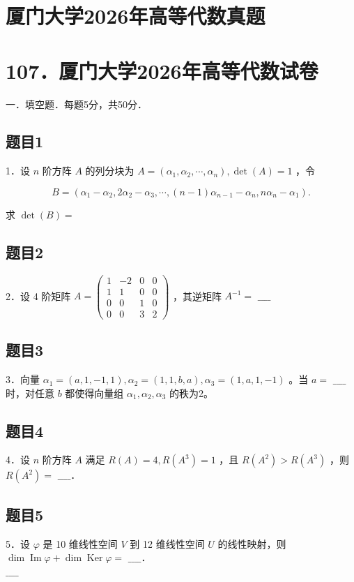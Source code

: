 \documentclass{article}
\begin{document}
\section*{厦门大学2026年高等代数真题}
\section*{107．厦门大学2026年高等代数试卷}
一．填空题．每题5分，共50分．\\

\subsection{题目1}
1．设 \(n\) 阶方阵 \(A\) 的列分块为 \(A=\left(\alpha_{1}, \alpha_{2}, \cdots, \alpha_{n}\right), \operatorname{det}(A)=1\) ，令

\[
B=\left(\alpha_{1}-\alpha_{2}, 2 \alpha_{2}-\alpha_{3}, \cdots,(n-1) \alpha_{n-1}-\alpha_{n}, n \alpha_{n}-\alpha_{1}\right) .
\]

求 \(\operatorname{det}(B)=\)

\subsection{题目2}
2．设 4 阶矩阵 \(A=\left(\begin{array}{cccc}1 & -2 & 0 & 0 \\ 1 & 1 & 0 & 0 \\ 0 & 0 & 1 & 0 \\ 0 & 0 & 3 & 2\end{array}\right)\) ，其逆矩阵 \(A^{-1}=\) \(\_\_\_\_\)

\subsection{题目3}
3．向量 \(\alpha_{1}=(a, 1,-1,1), \alpha_{2}=(1,1, b, a), \alpha_{3}=(1, a, 1,-1)\) 。当 \(a=\) \(\_\_\_\_\)时，对任意 \(b\) 都使得向量组 \(\alpha_{1}, \alpha_{2}, \alpha_{3}\) 的秩为2。

\subsection{题目4}
4．设 \(n\) 阶方阵 \(A\) 满足 \(R(A)=4, R\left(A^{3}\right)=1\) ，且 \(R\left(A^{2}\right)>R\left(A^{3}\right)\) ，则 \(R\left(A^{2}\right)=\) \(\_\_\_\_\)．

\subsection{题目5}
5．设 \(\varphi\) 是 10 维线性空间 \(V\) 到 12 维线性空间 \(U\) 的线性映射，则 \(\operatorname{dim} \operatorname{Im} \varphi+\operatorname{dim} \operatorname{Ker} \varphi=\) \(\_\_\_\_\)．\\
\(\_\_\_\_\)
\end{document}
